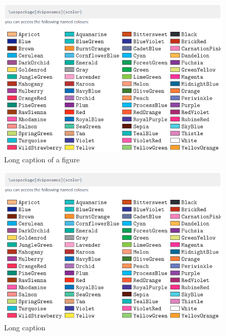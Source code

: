 \documentclass{uc-mse}
\begin{document}
\listoffigures


\begin{figure}
    \centering
    \includegraphics[width=0.7\linewidth]{figures/xcolors.png}
    \caption[Short caption of figure]{Long caption of a figure}
    \label{Available xcolors}
\end{figure}

\begin{figure}[h]
    \centering
    \includegraphics[width=0.7\linewidth]{figures/xcolors.png}
    \caption[Short caption]{Long caption}
    \label{Available xcolors}
\end{figure}
\end{document}

